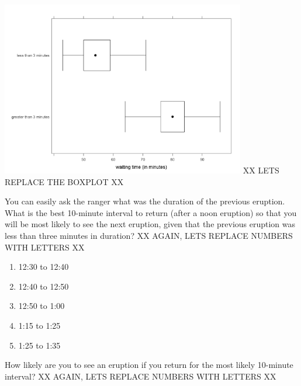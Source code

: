 \noindent


\includegraphics[width=4.2in]{includes/faithful2.png}
XX LETS REPLACE THE BOXPLOT XX





You can easily ask the ranger what was the duration of the previous
eruption. 
What is the best 10-minute interval to return (after a noon eruption)
so that you will be most likely to see the next eruption, given that
the previous eruption was less than three minutes in duration?
XX AGAIN, LETS REPLACE NUMBERS WITH LETTERS XX





\begin{enumerate}[leftmargin=1cm, itemsep=.1em]


\item 12:30 to 12:40


\item 12:40 to 12:50


\item 12:50 to 1:00


\item 1:15 to 1:25


\item 1:25 to 1:35


\end{enumerate}








\noindent


How likely are you to see an eruption if you return for the most
likely 10-minute interval?
XX AGAIN, LETS REPLACE NUMBERS WITH LETTERS XX





